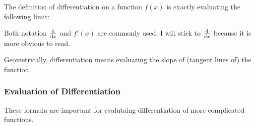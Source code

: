 \documentclass[class=article, crop=false, 12pt]{standalone}
\begin{document}
The definition of differentiation on a function $f(x)$ is exactly evaluating the following limit:

Both notation $\dv{x}$ and $f'(x)$ are commonly used. I will stick to $\dv{x}$ because it is more obvious to read. 

Geometrically, differentiation means evaluating the slope of (tangent lines of) the function.



\subsubsection{Evaluation of Differentiation}

These formula are important for evalutaing differentiation of more complicated functions.
\end{document}
